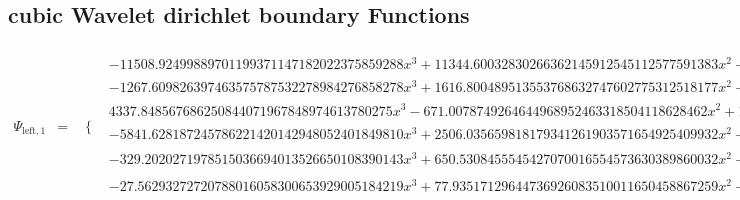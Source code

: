 \documentclass{article}
\begin{document}
 \begin{landscape}
 \subsection{cubic Wavelet dirichlet boundary Functions}
 \begin{eqnarray*}
 \Psi_{\text{left},1} & = & \begin{array}{cc}
 \{ & 
\begin{array}{cc}
 -11508.92499889701199371147182022375859288 x^3+11344.60032830266362145912545112577591383 x^2-3660.817919132090398330636100373051997139 x+385.1849905726112523123492496529573733546 & x\geq \frac{1}{4}\land x<\frac{3}{8} \\
 -1267.609826397463575787532278984276858278 x^3+1616.800489513553768632747602775312518177 x^2-685.5228784385049975225147080706108071881 x+97.35184784245442646155536321877504753784 & x\geq \frac{3}{8}\land x<\frac{1}{2} \\
 4337.848567686250844071967848974613780275 x^3-671.0078749264644968952463318504118628462 x^2+12.94417372426863155769545809593682601651 x & x\geq 0\land x<\frac{1}{8} \\
 -5841.628187245786221420142948052401849810 x^3+2506.035659818179341261903571654925409932 x^2-304.1537370744530905366493241697561345178 x+9.877724156431790184126909441384115082139 & x\geq \frac{1}{8}\land x<\frac{1}{4} \\
 -329.2020271978515036694013526650108390143 x^3+650.5308455545427070016554573630389860032 x^2-423.0590838792029899800207573977867894615 x+90.38638665260467908331505844552316931017 & \left(x\geq \frac{1}{2}\land x<\frac{5}{8}\right)\lor \left(x\geq \frac{5}{8}\land x<\frac{3}{4}\right) \\
 -27.56293272720788016058300653929005184219 x^3+77.93517129644736926083510011650458867259 x^2-73.18154441127109803992118061513902181861 x+22.80930584203160893966908703792448498821 & \left(x\geq \frac{3}{4}\land x<\frac{7}{8}\right)\lor \left(x\geq \frac{7}{8}\land x<1\right)
\end{array}


\end{array}
\end{eqnarray*}
\end{landscape}
\end{document}
